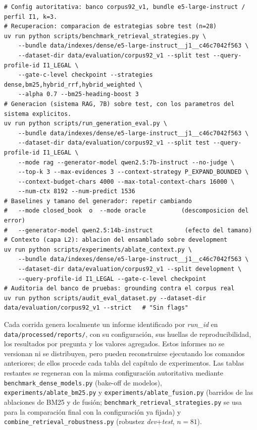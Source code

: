 \begin{lstlisting}
# Config autoritativa: banco corpus92_v1, bundle e5-large-instruct / perfil I1, k=3.
# Recuperacion: comparacion de estrategias sobre test (n=28)
uv run python scripts/benchmark_retrieval_strategies.py \
    --bundle data/indexes/dense/e5-large-instruct__j1__c46c7042f563 \
    --dataset-dir data/evaluation/corpus92_v1 --split test --query-profile-id I1_LEGAL \
    --gate-c-level checkpoint --strategies dense,bm25,hybrid_rrf,hybrid_weighted \
    --alpha 0.7 --bm25-heading-boost 3
# Generacion (sistema RAG, 7B) sobre test, con los parametros del sistema explicitos.
uv run python scripts/run_generation_eval.py \
    --bundle data/indexes/dense/e5-large-instruct__j1__c46c7042f563 \
    --dataset-dir data/evaluation/corpus92_v1 --split test --query-profile-id I1_LEGAL \
    --mode rag --generator-model qwen2.5:7b-instruct --no-judge \
    --top-k 3 --max-evidences 3 --context-strategy P_EXPAND_BOUNDED \
    --context-budget-chars 4000 --max-total-context-chars 16000 \
    --num-ctx 8192 --num-predict 1536
# Baselines y tamano del generador: repetir cambiando
#   --mode closed_book  o  --mode oracle          (descomposicion del error)
#   --generator-model qwen2.5:14b-instruct         (efecto del tamano)
# Contexto (capa L2): ablacion del ensamblado sobre development
uv run python scripts/experiments/ablate_context.py \
    --bundle data/indexes/dense/e5-large-instruct__j1__c46c7042f563 \
    --dataset-dir data/evaluation/corpus92_v1 --split development \
    --query-profile-id I1_LEGAL --gate-c-level checkpoint
# Auditoria del banco de pruebas: grounding contra el corpus real
uv run python scripts/audit_eval_dataset.py --dataset-dir data/evaluation/corpus92_v1 --strict   # "Sin flags"
\end{lstlisting}

Cada corrida genera localmente un informe identificado por \emph{run\_id} en \texttt{data/processed/reports/}, con su configuración, sus huellas de reproducibilidad, los resultados por pregunta y los valores agregados. Estos informes no se versionan ni se distribuyen, pero pueden reconstruirse ejecutando los comandos anteriores; de ellos procede cada tabla del capítulo de experimentos. Las tablas restantes se regeneran con la misma configuración autoritativa mediante \texttt{benchmark\_dense\_models.py} (bake-off de modelos), \texttt{experiments/ablate\_bm25.py} y \texttt{experiments/ablate\_fusion.py} (barridos de las ablaciones de BM25 y de fusión; \texttt{benchmark\_retrieval\_strategies.py} se usa para la comparación final con la configuración ya fijada) y \texttt{combine\_retrieval\_robustness.py} (robustez \emph{dev}+\emph{test}, $n=81$).

